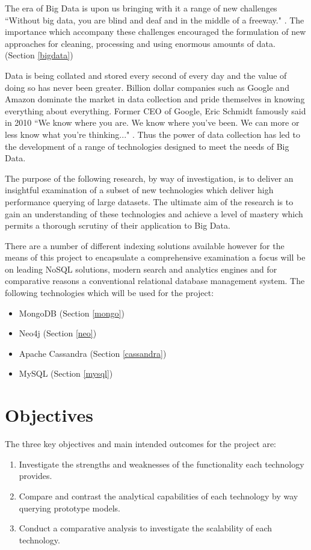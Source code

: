 The era of Big Data is upon us bringing with it a range of new challenges ``Without big data, you are blind and deaf and in the middle of a freeway."\cite{moore} . The importance which accompany these challenges encouraged the formulation of new approaches for cleaning, processing and using enormous amounts of data. (Section \ref{bigdata})

Data is being collated and stored every second of every day and the value of doing so has never been greater. Billion dollar companies such as Google and Amazon dominate the market in data collection and pride themselves in knowing everything about everything. Former CEO of Google, Eric Schmidt famously said in 2010 ``We know where you are. We know where you've been. We can more or less know what you're thinking..." \cite{schmidt}. Thus the power of data collection has led to the development of a range of technologies designed to meet the needs of Big Data.

The purpose of the following research, by way of investigation, is to deliver an insightful examination of a subset of new technologies which deliver high performance querying of large datasets. The ultimate aim of the research is to gain an understanding of these technologies and achieve a level of mastery which permits a thorough scrutiny of their application to Big Data.

There are a number of different indexing solutions available however for the means of this project to encapsulate a comprehensive examination a focus will be on leading NoSQL solutions, modern search and analytics engines and for comparative reasons a conventional relational database management system. The following technologies which will be used for the project: 

\begin{itemize}
\item MongoDB (Section \ref{mongo})
\item Neo4j (Section \ref{neo})
\item Apache Cassandra (Section \ref{cassandra})
\item MySQL (Section \ref{mysql})
\end{itemize}

\section{Objectives}\label{objectives}
The three key objectives and main intended outcomes for the project are:
\begin{enumerate}
\item Investigate the strengths and weaknesses of the functionality each technology provides.
\item Compare and contrast the analytical capabilities of each technology by way querying prototype models.
\item Conduct a comparative analysis to investigate the scalability of each technology.
\end{enumerate}


